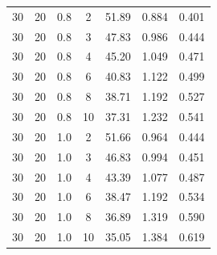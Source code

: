 \documentclass[11pt,a4paper]{article}
\begin{document}
\begin{longtable}{ccccccc}
        \midrule
        30 &  20  &  0.8  & 2 & 51.89 & 0.884 & 0.401 \\
        30 &  20  &  0.8  & 3 & 47.83 & 0.986 & 0.444 \\
        30 &  20  &  0.8  & 4 & 45.20 & 1.049 & 0.471 \\
        30 &  20  &  0.8  & 6 & 40.83 & 1.122 & 0.499 \\
        30 &  20  &  0.8  & 8 & 38.71 & 1.192 & 0.527 \\
        30 &  20  &  0.8  & 10 & 37.31 & 1.232 & 0.541 \\
        \midrule
        30 &  20  &  1.0  & 2 & 51.66 & 0.964 & 0.444 \\
        30 &  20  &  1.0  & 3 & 46.83 & 0.994 & 0.451 \\
        30 &  20  &  1.0  & 4 & 43.39 & 1.077 & 0.487 \\
        30 &  20  &  1.0  & 6 & 38.47 & 1.192 & 0.534 \\
        30 &  20  &  1.0  & 8 & 36.89 & 1.319 & 0.590 \\
        30 &  20  &  1.0  & 10 & 35.05 & 1.384 & 0.619 \\
        \midrule
        \midrule
\end{longtable}
\end{document}
